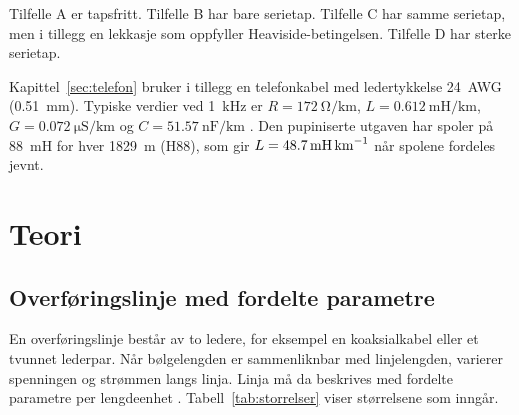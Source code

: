 \documentclass[11pt,a4paper]{article}
\numberwithin{equation}{section}
\numberwithin{figure}{section}
\numberwithin{table}{section}
\begin{document}
Tilfelle A er tapsfritt. Tilfelle B har bare serietap. Tilfelle C har samme
serietap, men i tillegg en lekkasje som oppfyller Heaviside-betingelsen.
Tilfelle D har sterke serietap.

Kapittel~\ref{sec:telefon} bruker i tillegg en telefonkabel med ledertykkelse
24~AWG (\SI{0.51}{\milli\metre}). Typiske verdier ved \SI{1}{\kilo\hertz} er
$R = \SI{172}{\ohm\per\kilo\metre}$, $L = \SI{0.612}{\milli\henry\per\kilo\metre}$,
$G = \SI{0.072}{\micro\siemens\per\kilo\metre}$ og
$C = \SI{51.57}{\nano\farad\per\kilo\metre}$ \cite{reeve1995}. Den pupiniserte
utgaven har spoler på \SI{88}{\milli\henry} for hver \SI{1829}{\metre} (H88),
som gir $L = \SI{\Lpupin}{\milli\henry\per\kilo\metre}$ når spolene fordeles jevnt.

\section{Teori}\label{sec:teori}

\subsection{Overføringslinje med fordelte parametre}
En overføringslinje består av to ledere, for eksempel en koaksialkabel eller et
tvunnet lederpar. Når bølgelengden er sammenliknbar med linjelengden, varierer
spenningen og strømmen langs linja. Linja må da beskrives med fordelte
parametre per lengdeenhet \cite{pozar2012,paul2008}. Tabell~\ref{tab:storrelser}
viser størrelsene som inngår.
\end{document}
